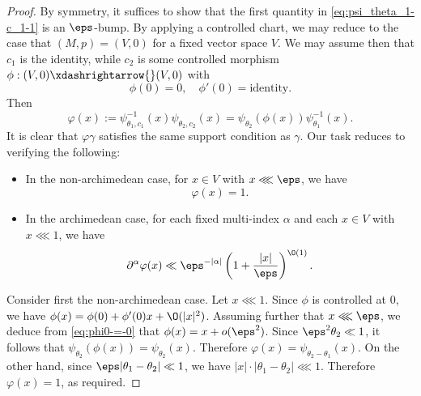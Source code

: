 \begin{proof}
  By symmetry, it suffices to show that the first quantity in \eqref{eq:psi_theta_1-c_1-1} is an $\eps$-bump.  By applying a controlled chart, we may reduce to the case that $(M,p) = (V,0)$ for a fixed vector space $V$.  We may assume then that $c_1$ is the identity, while $c_2$ is some controlled morphism $\phi : (V,0) \xdashrightarrow{} (V,0)$ with
  \begin{equation}\label{eq:phi0-=-0}
    \phi(0) = 0, \quad \phi '(0) = \text{identity}.
  \end{equation}
  Then
  \begin{equation*}
    \varphi(x) := \psi_{\theta_1,c_1}^{-1}(x) \psi_{\theta_2,c_2}(x) = \psi_{\theta_2}(\phi(x)) \psi_{\theta_1}^{-1}(x).
  \end{equation*}
  It is clear that $\varphi \gamma$ satisfies the same support condition as $\gamma$.  Our task reduces to verifying the following:
  \begin{itemize}
  \item In the non-archimedean case, for $x \in V$ with $x \lll \eps$, we have
    \begin{equation*}
      \varphi(x) = 1.
    \end{equation*}
  \item In the archimedean case, for each fixed multi-index $\alpha$ and each $x \in V$ with $x \lll 1$, we have
    \begin{equation}\label{eq:part-varphi-x}
      \partial^{\alpha} \varphi (x)
      \ll \eps^{-|\alpha|} \left( 1 + \frac{|x|}{\eps} \right)^{\O(1)}.
    \end{equation}
  \end{itemize}


  Consider first the non-archimedean case.  Let $x \lll 1$.  Since $\phi$ is controlled at $0$, we have $\phi(x) = \phi(0) + \phi '(0) x + \O(|x|^2)$.  Assuming further that $x \lll \eps$, we deduce from \eqref{eq:phi0-=-0} that $\phi(x) = x + o(\eps^2)$.  Since $\eps^2 \theta_2 \ll 1$, it follows that $\psi_{\theta_2}(\phi(x)) = \psi_{\theta_2}(x)$.  Therefore $\varphi(x) = \psi_{\theta_2 - \theta_1}(x)$.  On the other hand, since $\eps |\theta_1 - \theta_2| \ll 1$, we have $|x| \cdot |\theta_1 - \theta_2| \lll 1$.  Therefore $\varphi(x) = 1$, as required.


\end{proof}

